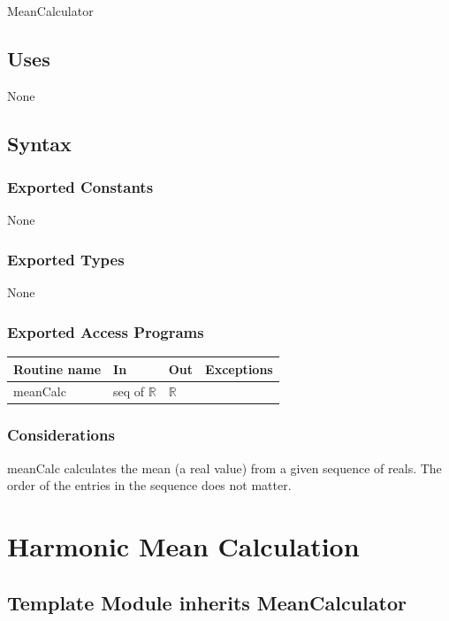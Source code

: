\documentclass[12pt,fleqn]{examtst}
\begin{document}
MeanCalculator

\subsection* {Uses}

None

\subsection* {Syntax}

\subsubsection* {Exported Constants}

None

\subsubsection* {Exported Types}

None 

\subsubsection* {Exported Access Programs}

\begin{tabular}{| l | l | l | p{5cm} |}
\hline
\textbf{Routine name} & \textbf{In} & \textbf{Out} & \textbf{Exceptions}\\
\hline
meanCalc & seq of $\mathbb{R}$ & $\mathbb{R}$ & ~\\
\hline
\end{tabular}

\subsubsection* {Considerations}

meanCalc calculates the mean (a real value) from a given sequence of reals.
The order of the entries in the sequence does not matter.


\newpage

\section* {Harmonic Mean Calculation}

\subsection*{Template Module inherits MeanCalculator}
\end{document}
